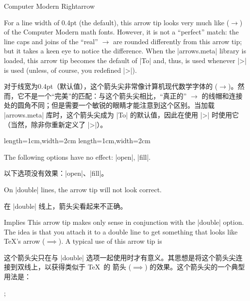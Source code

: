 \begin{arrowtip}{Computer Modern Rightarrow}{
    For a line width of 0.4pt (the default), this arrow tip looks very much
    like \texttt{\string\rightarrow} ($\to$) of the Computer Modern math fonts.
    However, it is not a ``perfect'' match: the line caps and joins of the
    ``real'' $\to$ are rounded differently from this arrow tip; but it takes a
    keen eye to notice the difference. When the |arrows.meta| library is loaded,
    this arrow tip becomes the default of |To| and, thus, is used whenever |>|
    is used (unless, of course, you redefined |>|).

    对于线宽为0.4pt（默认值），这个箭头尖非常像计算机现代数学字体的 \texttt{\string\rightarrow} ($\to$)。然而，它不是一个“完美”的匹配：与这个箭头尖相比，“真正的” $\to$ 的线帽和连接处的圆角不同；但是需要一个敏锐的眼睛才能注意到这个区别。当加载 |arrows.meta| 库时，这个箭头尖成为 |To| 的默认值，因此在使用 |>| 时使用它（当然，除非你重新定义了 |>|）。

}%
{length=1cm,width=2cm}%
{length=1cm,width=2cm}

    \begin{arrowexamples}
        \arrowexample[]
        \arrowexampledup[sep]
        \arrowexampledupdot[sep]
        \arrowexample[length=3pt]
        \arrowexample[sharp]
        \arrowexample[slant=.3]
        \arrowexample[left]
        \arrowexample[right]
        \arrowexample[red]
    \end{arrowexamples}
    The following options have no effect: |open|, |fill|.

    以下选项没有效果：|open|、|fill|。



    On |double| lines, the arrow tip will not look correct.

    在 |double| 线上，箭头尖看起来不正确。


\end{arrowtip}

\begin{arrowtipsimple}{Implies}
    This arrow tip makes only sense in conjunction with the |double| option.
    The idea is that you attach it to a double line to get something that looks
    like \TeX's \texttt{\string\implies} arrow ($\implies$). A typical use of
    this arrow tip is

    这个箭头尖只在与 |double| 选项一起使用时才有意义。其思想是将这个箭头尖连接到双线上，以获得类似于 \TeX\ 的 \texttt{\string\implies} 箭头 ($\implies$) 的效果。这个箭头尖的一个典型用法是：

\begin{codeexample}[preamble={\usetikzlibrary{arrows.meta,graphs}}]
\tikz {};
\end{codeexample}
    \begin{arrowexamples}
        \arrowexampledouble[]
        \arrowexampledouble[red]
    \end{arrowexamples}
\end{arrowtipsimple}

